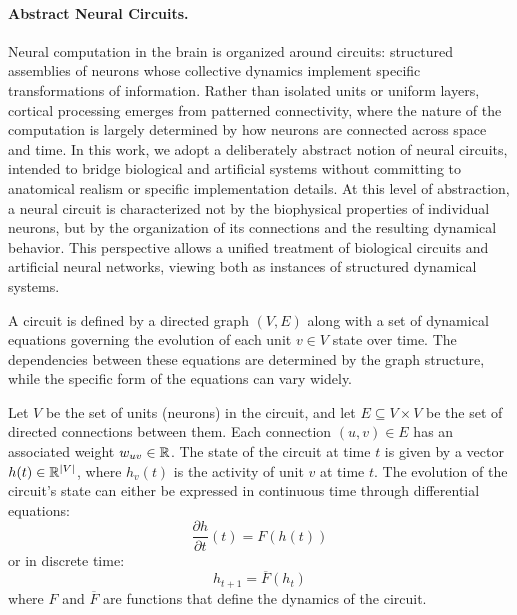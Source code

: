 


\paragraph{Abstract Neural Circuits.}
Neural computation in the brain is organized around circuits: structured assemblies of neurons whose collective dynamics implement specific transformations of information. Rather than isolated units or uniform layers, cortical processing emerges from patterned connectivity, where the nature of the computation is largely determined by how neurons are connected across space and time. In this work, we adopt a deliberately abstract notion of neural circuits, intended to bridge biological and artificial systems without committing to anatomical realism or specific implementation details.
%
At this level of abstraction, a neural circuit is characterized not by the biophysical properties of individual neurons, but by the organization of its connections and the resulting dynamical behavior. This perspective allows a unified treatment of biological circuits and artificial neural networks, viewing both as instances of structured dynamical systems.

\begin{definition}[Circuit]
A circuit is defined by a directed graph $(V, E)$ along with a set of dynamical equations governing the evolution of each unit $v \in V$ state over time. The dependencies between these equations are determined by the graph structure, while the specific form of the equations can vary widely.

Let $V$ be the set of units (neurons) in the circuit, and let $E \subseteq V \times V$ be the set of directed connections between them. Each connection $(u,v) \in E$ has an associated weight $w_{uv} \in \mathbb{R}$. The state of the circuit at time $t$ is given by a vector $h(t) \in \mathbb{R}^{|V|}$, where $h_v(t)$ is the activity of unit $v$ at time $t$. The evolution of the circuit's state can either be expressed in continuous time through differential equations:
\begin{equation}
\label{eq:neural_circuit:continuous}
\frac{\partial h}{\partial t}(t) = F(h(t))
\end{equation}
or in discrete time:
\begin{equation}
\label{eq:neural_circuit:discrete}
h_{t+1} = \overline{F}(h_t)
\end{equation}
where $F$ and $\overline{F}$ are functions that define the dynamics of the circuit.
\end{definition}

